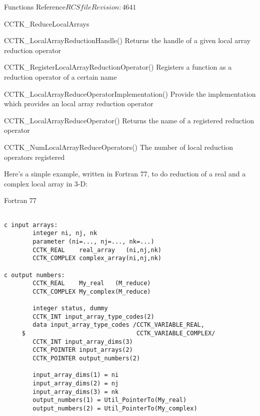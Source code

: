 \begin{cactuspart}{ Functions Reference}{$RCSfile$}{$Revision: 4641 $}
\begin{FunctionDescription}{CCTK\_ReduceLocalArrays}
\begin{SeeAlsoSection}
\begin{SeeAlso}{CCTK\_LocalArrayReductionHandle()}
Returns the handle of a given local array reduction operator
\end{SeeAlso}

\begin{SeeAlso}{CCTK\_RegisterLocalArrayReductionOperator()}
Registers a function as a reduction operator of a certain name
\end{SeeAlso}

\begin{SeeAlso}{CCTK\_LocalArrayReduceOperatorImplementation()}
Provide the implementation which provides an local array reduction operator
\end{SeeAlso}

\begin{SeeAlso}{CCTK\_LocalArrayReduceOperator()}
Returns the name of a registered reduction operator
\end{SeeAlso}

\begin{SeeAlso}{CCTK\_NumLocalArrayReduceOperators()}
The number of local reduction operators registered
\end{SeeAlso}
\end{SeeAlsoSection}

\begin{ExampleSection}
\begin{ExampleDescription}
Here's a simple example, written in Fortran 77, to do reduction
of a real and a complex local array in 3-D:
\end{ExampleDescription}
\begin{Example}{Fortran 77}
\begin{verbatim}

c input arrays:
        integer ni, nj, nk
        parameter (ni=..., nj=..., nk=...)
        CCTK_REAL    real_array   (ni,nj,nk)
        CCTK_COMPLEX complex_array(ni,nj,nk)

c output numbers:
        CCTK_REAL    My_real   (M_reduce)
        CCTK_COMPLEX My_complex(M_reduce)

        integer status, dummy
        CCTK_INT input_array_type_codes(2)
        data input_array_type_codes /CCTK_VARIABLE_REAL,
     $                               CCTK_VARIABLE_COMPLEX/
        CCTK_INT input_array_dims(3)
        CCTK_POINTER input_arrays(2)
        CCTK_POINTER output_numbers(2)

        input_array_dims(1) = ni
        input_array_dims(2) = nj
        input_array_dims(3) = nk
        output_numbers(1) = Util_PointerTo(My_real)
        output_numbers(2) = Util_PointerTo(My_complex)


\end{verbatim}
\end{Example}
\end{ExampleSection}
\end{FunctionDescription}
\end{cactuspart}

